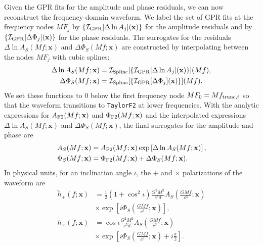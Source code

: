 \documentclass[prd,aps,letter,twocolumn,floatfix,notitlepage,nofootinbib]{revtex4-1}
\def\bx{\mathbf{x}}
\newcommand{\MP}[1]{{\textcolor{blue}{\texttt{MP: #1}} }}
\newcommand{\red}[1]{\textcolor{red}{#1}}
\begin{document}
Given the GPR fits for the amplitude and phase residuals, we can now reconstruct the frequency-domain waveform. We label the set of GPR fits at the frequency nodes $MF_j$ by $\{\mathcal{I}_{\rm GPR}[\Delta\ln A_j](\bx)\}$ for the amplitude residuals and by $\{\mathcal{I}_{\rm GPR}[\Delta\Phi_j](\bx)\}$ for the phase residuals. The surrogates for the residuals $\Delta\ln A_S(Mf;\bx)$ and $\Delta\Phi_S(Mf;\bx)$ are constructed by interpolating between the nodes $MF_j$ with cubic splines:
\begin{align}
\Delta\ln A_S(Mf;\bx) &= \mathcal{I}_{\rm Spline}[\{\mathcal{I}_{\rm GPR}[\Delta\ln A_j](\bx)\}](Mf),\\
\Delta\Phi_S(Mf;\bx) &= \mathcal{I}_{\rm Spline}[\{\mathcal{I}_{\rm GPR}[\Delta\Phi_j](\bx)\}](Mf).
\end{align}
We set these functions to 0 below the first frequency node $MF_0 =  Mf_{{\rm trunc},i}$ so that the waveform transitions to \texttt{TaylorF2} at lower frequencies. With the analytic expressions for $A_{\rm F2}(Mf;\bx)$ and $\Phi_{\rm F2}(Mf;\bx)$ and the interpolated expressions $\Delta\ln A_S(Mf;\bx)$ and $\Delta\Phi_S(Mf;\bx)$, the final surrogates for the amplitude and phase are
\begin{align}
\label{eq:amp_sur}
A_S(Mf;\bx) &= A_{\rm F2}(Mf;\bx) \exp\left[ \Delta\ln A_S(Mf;\bx) \right], \\
\label{eq:phase_sur}
\Phi_S(Mf;\bx) &= \Phi_{\rm F2}(Mf;\bx) + \Delta\Phi_S(Mf;\bx).
\end{align}
In physical units, for an inclination angle $\iota$, the $+$ and $\times$ polarizations of the waveform are 
\begin{align}
\label{eq:hplus_sur}
\tilde h_+(f; \bx) &= \frac{1}{2}(1+\cos^2\iota) \frac{G^2 M^2}{c^5 d} A_S\left(\frac{GMf}{c^3}; \bx\right) \nonumber \\
& \times \exp\left[i \Phi_S\left(\frac{GMf}{c^3}; \bx\right)\right], \\
\label{eq:hcross_sur}
\tilde h_\times(f; \bx) &= \cos\iota \frac{G^2 M^2}{c^5 d} A_S\left(\frac{GMf}{c^3}; \bx\right) \nonumber \\
& \times \exp\left[i \Phi_S\left(\frac{GMf}{c^3}; \bx\right) + i \frac{\pi}{2}\right].
\end{align}


\end{document}
